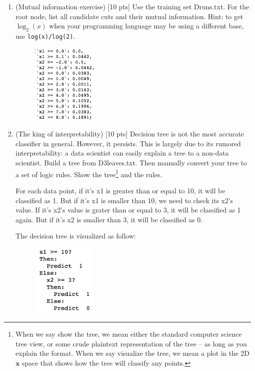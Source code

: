 \documentclass[a4paper]{article}
\theoremstyle{definition}
\def\x{\mathbf x}
\newenvironment{soln}{
    \leavevmode\color{blue}\ignorespaces
}{}
\begin{document}
\begin{enumerate}
\item (Mutual information exercise)  [10 pts] Use the training set Druns.txt.  For the root node, list all candidate cuts and their mutual information.  Hint: to get $\log_2(x)$ when your programming language may be using a different base, use \verb|log(x)/log(2)|.

\begin{soln} 
	    \begin{figure}[H]
	        \centering
	        \includegraphics[width=0.3\textwidth]{question3.pdf}
	        \captionsetup{labelformat=empty}
	        \caption{}
	        \label{fig:my_label}
	    \end{figure}
\end{soln}

\item (The king of interpretability)  [10 pts] Decision tree is not the most accurate classifier in general.  However, it persists.  This is largely due to its rumored interpretability: a data scientist can easily explain a tree to a non-data scientist.  Build a tree from D3leaves.txt.  Then manually convert your tree to a set of logic rules.  Show the tree\footnote{When we say show the tree, we mean either the standard computer science tree view, or some crude plaintext representation of the tree -- as long as you explain the format.  When we say visualize the tree, we mean a plot in the 2D $\x$ space that shows how the tree will classify any points.} and the rules.

\begin{soln} 
For each data point, if it's x1 is greater than or equal to 10, it will be classified as 1. But if it's x1 is smaller than 10, we need to check its x2's value. If it's x2's value is grater than or equal to 3, it will be classified as 1 again. But if it's x2 is smaller than 3, it will be classified as 0.

The decision tree is visualized as follow: 
	    \begin{figure}[H]
	        \centering
	        \includegraphics[width=0.3\textwidth]{question4.pdf}
	        \captionsetup{labelformat=empty}
	        \caption{}
	        \label{fig:my_label}
	    \end{figure}
\end{soln}


\end{enumerate}
\end{document}
